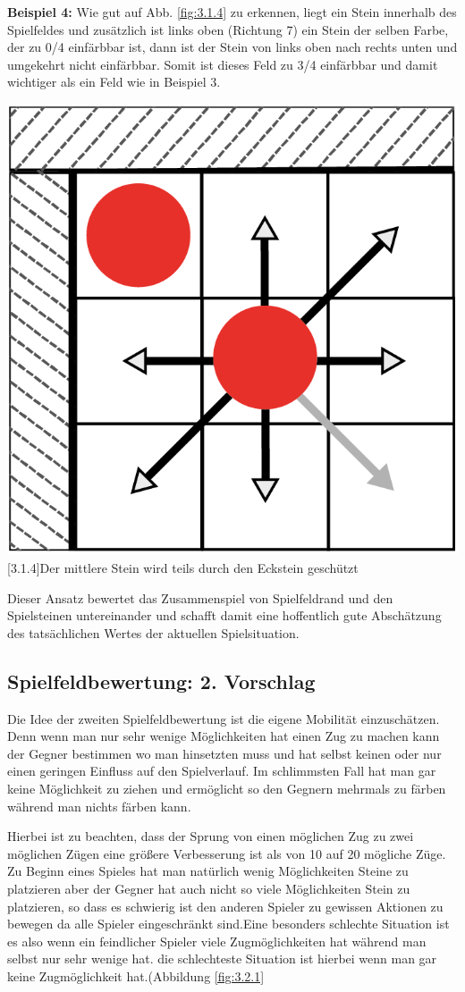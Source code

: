 \documentclass[12pt,a4paper,bibliography=totocnumbered,listof=totocnumbered]{scrartcl}
\begin{document}
    \textbf{Beispiel 4:} Wie gut auf Abb. \ref{fig:3.1.4} zu erkennen, liegt ein Stein innerhalb des Spielfeldes und zusätzlich ist links oben (Richtung 7) ein Stein der selben Farbe, der zu 0/4 einfärbbar ist, dann ist der Stein von links oben nach rechts unten und umgekehrt nicht einfärbbar. Somit ist dieses Feld zu 3/4 einfärbbar und damit wichtiger als ein Feld wie in Beispiel 3.\newline

   	\vspace{1em}
    \begin{minipage}{\linewidth}
    	\centering
    	\includegraphics[width=0.33\linewidth]{pics/Kapitel_3/Kapitel_3_pic4.png}
    	[3.1.4]{Der mittlere Stein wird teils durch den Eckstein geschützt}
    	\label{fig:3.1.4}
    \end{minipage}
	\vspace{1em}
	
	Dieser Ansatz bewertet das Zusammenspiel von Spielfeldrand und den Spielsteinen untereinander und schafft damit eine hoffentlich gute Abschätzung des tatsächlichen Wertes der aktuellen Spielsituation.

    \subsection{Spielfeldbewertung: 2. Vorschlag}

    Die Idee der zweiten Spielfeldbewertung ist die eigene Mobilität einzuschätzen. Denn wenn man nur sehr wenige Möglichkeiten hat einen Zug zu machen kann der Gegner bestimmen wo man hinsetzten muss und hat selbst keinen oder nur einen geringen Einfluss auf den Spielverlauf. Im schlimmsten Fall hat man gar keine Möglichkeit zu ziehen und ermöglicht so den Gegnern mehrmals zu färben während man nichts färben kann.

    \vspace{1em}


    Hierbei ist zu beachten, dass der Sprung von einen möglichen Zug zu zwei möglichen Zügen eine größere Verbesserung ist als von 10 auf 20 mögliche Züge.
    Zu Beginn eines Spieles hat man natürlich wenig Möglichkeiten Steine zu platzieren aber der Gegner hat auch nicht so viele Möglichkeiten Stein zu platzieren, so dass es schwierig ist den anderen Spieler zu gewissen Aktionen zu bewegen da alle Spieler eingeschränkt sind.Eine besonders schlechte Situation ist es also wenn ein feindlicher Spieler viele Zugmöglichkeiten hat während man selbst nur sehr wenige hat.
    die schlechteste Situation ist hierbei wenn man gar keine Zugmöglichkeit hat.(Abbildung \ref{fig:3.2.1} 
\end{document}
